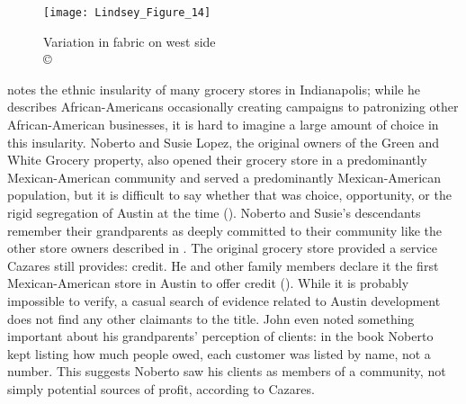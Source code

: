 \begin{wrapfigure}{O}[3cm]{0.5\textwidth}
	\texttt{[image: Lindsey\_Figure\_14]}
	\caption{Variation in fabric on west side\\
		{\normalfont\scriptsize \copyright\
			\shortauthor
	}}
	\label{fig:Lindsey_Figure_14}
\end{wrapfigure}
\textcite{mullins} notes the ethnic insularity of many grocery stores in Indianapolis; while he describes African-Americans occasionally creating campaigns to patronizing other African-American businesses, it is hard to imagine a large amount of choice in this insularity. Noberto and Susie Lopez, the original owners of the Green and White Grocery property, also opened their grocery store in a predominantly Mexican-American community and served a predominantly Mexican-American population, but it is difficult to say whether that was choice, opportunity, or the rigid segregation of Austin at the time (\cite{hernandez}).
Noberto and Susie's descendants remember their grandparents as deeply committed to their community like the other store owners described in \textcite{mullins}. The original grocery store provided a service Cazares still provides: credit. He and other family members declare it the first Mexican-American store in Austin to offer credit (\cite{lepe}). While it is probably impossible to verify, a casual search of evidence related to Austin development does not find any other claimants to the title. John even noted something important about his grandparents' perception of clients: in the book Noberto kept listing how much people owed, each customer was listed by name, not a number. This suggests Noberto saw his clients as members of a community, not simply potential sources of profit, according to Cazares.



